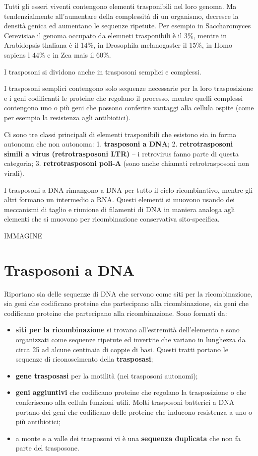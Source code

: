 \documentclass[11pt]{book}
\begin{document}
Tutti gli esseri viventi contengono elementi trasponibili nel loro
genoma. Ma tendenzialmente all'aumentare della complessità di un
organismo, decresce la densità genica ed aumentano le sequenze ripetute.
Per esempio in Saccharomyces Cerevisiae il genoma occupato da elemneti
trasponibili è il 3\%, mentre in Arabidopsis thaliana è il 14\%, in
Drosophila melanogaster il 15\%, in Homo sapiens l 44\% e in Zea mais il
60\%.

I trasposoni si dividono anche in trasposoni semplici e complessi.

I trasposoni semplici contengono solo sequenze necessarie per la loro
trasposizione e i geni codificanti le proteine che regolano il processo,
mentre quelli complessi contengono uno o più geni che possono conferire
vantaggi alla cellula ospite (come per esempio la resistenza agli
antibiotici).

Ci sono tre classi principali di elementi trasponibili che esistono sia
in forma autonoma che non autonoma: 1. \textbf{trasposoni a DNA}; 2.
\textbf{retrotrasposoni simili a virus (retrotrasposoni LTR)} -- i
retrovirus fanno parte di questa categoria; 3. \textbf{retrotrasposoni
poli-A} (sono anche chiamati retrotrasposoni non virali).

I trasposoni a DNA rimangono a DNA per tutto il ciclo ricombinativo,
mentre gli altri formano un intermedio a RNA. Questi elementi si muovono
usando dei meccanismi di taglio e riunione di filamenti di DNA in
maniera analoga agli elementi che si muovono per ricombinazione
conservativa sito-specifica.

IMMAGINE



\section{Trasposoni a DNA}\label{trasposoni-a-dna}

Riportano sia delle sequenze di DNA che servono come siti per la
ricombinazione, sia geni che codificano proteine che partecipano alla
ricombinazione, sia geni che codificano proteine che partecipano alla
ricombinazione. Sono formati da:

\begin{itemize}
\itemsep1pt\parskip0pt
\item
  \textbf{siti per la ricombinazione} si trovano all'estremità
  dell'elemento e sono organizzati come sequenze ripetute ed invertite
  che variano in lunghezza da circa 25 ad alcune centinaia di coppie di
  basi. Questi tratti portano le sequenze di riconoscimento della
  \textbf{trasposasi};
\item
  \textbf{gene trasposasi} per la motilità (nei trasposoni autonomi);
\item
  \textbf{geni aggiuntivi} che codificano proteine che regolano la
  trasposizione o che conferiscono alla cellula funzioni utili. Molti
  trasposoni batterici a DNA portano dei geni che codificano delle
  proteine che inducono resistenza a uno o più antibiotici;
\item
  a monte e a valle dei trasposoni vi è una \textbf{sequenza duplicata}
  che non fa parte del trasposone.
\end{itemize}
\end{document}
